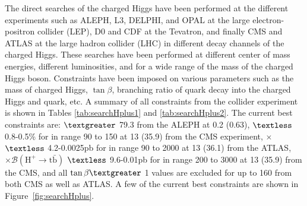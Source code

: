 The direct searches of the charged Higgs have been performed at the different
experiments such as ALEPH, L3, DELPHI, and OPAL at the large electron-positron 
collider (LEP), D0 and CDF at the Tevatron, and finally CMS and ATLAS at the large hadron
collider (LHC) in different decay channels of the charged Higgs. These searches
have been performed at different center of mass energies, different luminosities,
and for a wide range of the mass of the charged Higgs boson. Constraints have
been imposed on various parameters such as the mass of charged Higgs, $\tan\beta$, 
branching ratio of \PQt quark decay into the charged Higgs and \PQb quark, etc. A 
summary of all constraints from the collider experiment is shown in Tables 
\ref{tab:searchHplus1} and \ref{tab:searchHplus2}. The current best constraints 
are: \mHp $\textgreater$ 79.3 \GeV from the ALEPH at 0.2 \TeV (0.63\fbinv), 
\brThb $\textless$ 0.8-0.5\% for \mHp in range 90 to 150 \GeV at 13 \TeV 
(35.9\fbinv) from the CMS experiment, \sigHp $\times$ \brHtv $\textless$ 
4.2-0.0025\unit{pb} for \mHp in range 90 to 2000 \GeV at 13 \TeV (36.1\fbinv) from 
the ATLAS, \sigHp $\times \mathcal{B}(\text{H}^+ \rightarrow \text{t}\bar{\text{b}})$  $\textless$ 
9.6-0.01\unit{pb} for \mHp in range 200 to 3000 \GeV at 13 \TeV (35.9\fbinv) from 
the CMS, and all $\tan\beta \textgreater $ 1 values are excluded for \mHp up to 
160 \GeV from both CMS as well as ATLAS. A few of the current best constraints 
are shown in Figure~\ref{fig:searchHplus}.
